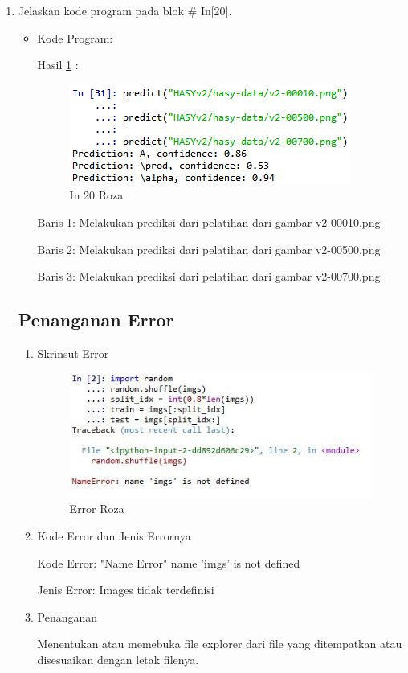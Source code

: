 \begin{enumerate}
\item Jelaskan kode program pada blok \# In[20].
\begin{itemize}
\item Kode Program:

\par Hasil \ref{in20roza} :
\begin{figure}[!hbtp]
\centering
\includegraphics[scale=0.7]{figures/prak20roza.png}
\caption{In 20 Roza}
\label{in20roza}
\end{figure}
\par Baris 1: Melakukan prediksi dari pelatihan dari gambar v2-00010.png
\par Baris 2: Melakukan prediksi dari pelatihan dari gambar v2-00500.png
\par Baris 3: Melakukan prediksi dari pelatihan dari gambar v2-00700.png 
\end{itemize}
\par

\subsection{Penanganan Error}
\begin{enumerate}

\item Skrinsut Error
\begin{figure}[ht]
\centering
\includegraphics[scale=0.7]{figures/erorchap7roza.jpg}
\caption{ Error Roza}
\label{6}
\end{figure}
\item Kode Error dan Jenis Errornya
\par Kode Error: "Name Error" name 'imgs'  is not defined
\par Jenis Error: Images tidak terdefinisi
\item Penanganan
\par Menentukan atau memebuka file explorer dari file yang ditempatkan atau disesuaikan dengan letak filenya.

\end{enumerate}
\end{enumerate}








